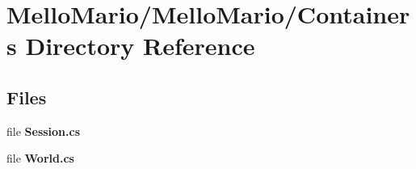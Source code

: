 \section{Mello\+Mario/\+Mello\+Mario/\+Containers Directory Reference}
\label{dir_096150ea0729a4252ad0bcd6ecdd1e45}
\subsection*{Files}
\begin{DoxyCompactItemize}
\item 
file \textbf{ Session.\+cs}
\item 
file \textbf{ World.\+cs}
\end{DoxyCompactItemize}
